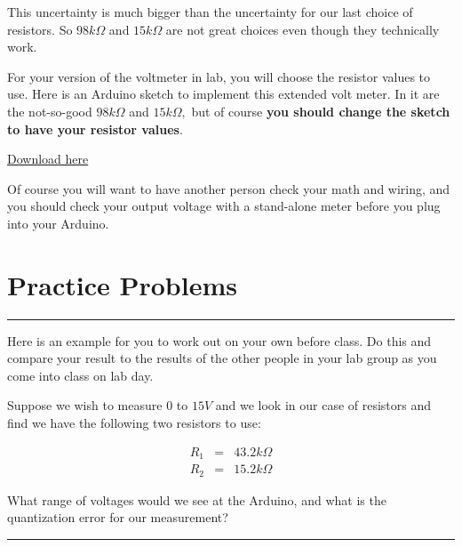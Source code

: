 This uncertainty is much bigger than the uncertainty for our last choice of resistors. So $98\unit{k\Omega}$ and $15\unit{k\Omega}$ are not great choices even though they technically work.

For your version of the voltmeter in lab, you will choose the resistor values to use. Here is an Arduino sketch to implement this extended volt meter. In it are the not-so-good $98\unit{k\Omega}$ and $15\unit{k\Omega},$ but of course \textbf{you should change the sketch to have your resistor
values}.

\href{https://raw.githubusercontent.com/rtlines/IntermediateLabPH250/main/Code/DAQ_Extended_voltmeter.ino}{Download here}



\bigskip Of course you will want to have another person check your math and
wiring, and you should check your output voltage with a stand-alone meter
before you plug into your Arduino.

\section{Practice Problems}

\rule{11cm}{0.03cm}

Here is an example for you to work out on your own before class. Do this and compare your result to the results of the other people in your lab group as you come into class on lab day.

Suppose we wish to measure $0$ to $15\unit{V}$ and we look in our case of resistors and find we have the following two resistors to use:

\begin{eqnarray*}
	R_{1} &=&43.2\unit{k\Omega} \\
	R_{2} &=&15.2\unit{k\Omega}
\end{eqnarray*}

What range of voltages would we see at the Arduino, and what is the quantization error for our measurement?

\rule{11cm}{0.03cm}



